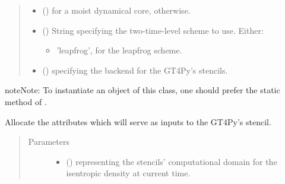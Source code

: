 \documentclass[letterpaper,10pt,english]{sphinxmanual}
\begin{document}
\begin{fulllineitems}
\begin{fulllineitems}
\begin{quote}
\begin{description}
\begin{itemize}
\item {} 
 () \textendash{}  for a moist dynamical core,  otherwise.

\item {} 
 () \textendash{} 
String specifying the two-time-level scheme to use. Either:
\begin{itemize}
\item {} 
’leapfrog’, for the leapfrog scheme.

\end{itemize}


\item {} 
 () \textendash{}  specifying the backend for the GT4Py’s stencils.

\end{itemize}

\end{description}\end{quote}

\begin{sphinxadmonition}{note}{Note:}
To instantiate an object of this class, one should prefer the static method
{\hyperref[\detokenize{api:dycore.prognostic_isentropic.PrognosticIsentropic.factory}]{}} of
{\hyperref[\detokenize{api:dycore.prognostic_isentropic.PrognosticIsentropic}]{}}.
\end{sphinxadmonition}

\end{fulllineitems}


\begin{fulllineitems}
\label{\detokenize{api:dycore.prognostic_isentropic.PrognosticIsentropicTL2._allocate_inputs}}
Allocate the attributes which will serve as inputs to the GT4Py’s stencil.
\begin{quote}\begin{description}
\item[{Parameters}] \leavevmode\begin{itemize}
\item {} 
 () \textendash{}  representing the stencils’ computational domain for the isentropic density at current time.


\end{itemize}
\end{description}
\end{quote}
\end{fulllineitems}
\end{fulllineitems}
\end{document}
